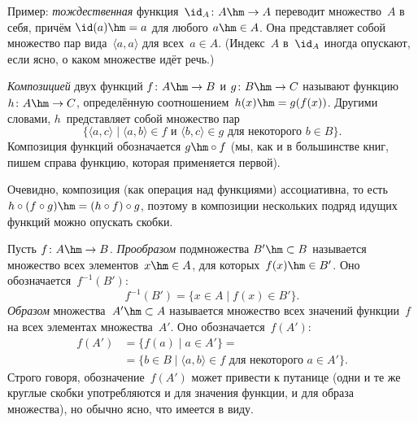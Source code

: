         \label{identity-function}%
Пример: \emph{тождественная}%
 функция~$\id_A\colon A\hm\to A$
переводит множество~$A$ в себя, причём $\id(a)\hm=a$ для любого $a\hm\in
A$. Она представляет собой множество пар вида~$\langle a,a\rangle$
для всех~$a\in A$. (Индекс~$A$ в~$\id_A$ иногда опускают,
если ясно, о каком множестве идёт речь.)

        \label{composition}%
\emph{Композицией}
двух функций $f\colon A \hm\to B$ и $g\colon B\hm\to C$
называют функцию $h\colon A\hm\to C$, определённую
соотношением~$h(x)\hm=g(f(x))$. Другими словами, $h$~представляет собой
множество пар
        $$
\{\langle a,c\rangle \mid \langle a,b\rangle \in f \text{ и }
   \langle b,c\rangle \in g \text{ для некоторого $b\in B$}\}.
        $$
Композиция функций обозначается $g\hm\circ f$ (мы, как и в
большинстве книг, пишем справа функцию, которая применяется
первой).

Очевидно, композиция (как операция над функциями)
ассоциативна, то есть $h\circ (f\circ g) \hm=
(h\circ f)\circ g$, поэтому в композиции нескольких подряд
идущих функций можно опускать скобки.

        \label{preimage}%
Пусть $f\colon A\hm\to B$. \emph{Прообразом}
подмножества $B'\hm\subset B$
называется множество всех элементов~$x\hm\in A$, для которых~$f(x)\hm\in B'$.
Оно обозначается~$f^{-1}(B')$:
        $$
f^{-1}(B')=\{ x \in A \mid f(x)\in B'\}.
        $$
        \label{image}%
\emph{Образом} множества~$A'\hm\subset A$ называется множество всех
значений функции~$f$ на всех элементах множества~$A'$. Оно
обозначается~$f(A')$:
        \begin{align*}
f(A')& =\{f(a)\mid a\in A'\}=\\ &= \{ b\in B\mid\langle a,b\rangle \in f
                        \text{ для некоторого $a\in A'$}\}.
        \end{align*}
Строго говоря, обозначение~$f(A')$ может привести к путанице (одни и
те же круглые скобки употребляются и для значения функции, и для
образа множества), но
обычно ясно, что имеется в виду.

